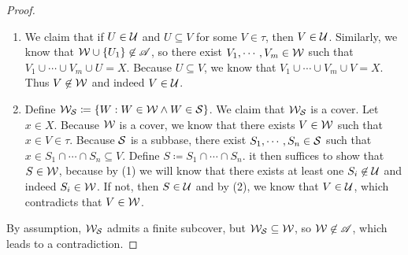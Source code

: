 \documentclass[screen,single]{techreport}
\numberwithin{equation}{section}
\begin{document}
\begin{proof}
\begin{enumerate}
		\item We claim that if $U \in \mathcal{U}$ and $U \subseteq V$ for some $V \in \tau$, then $V \in \mathcal{U}$.
		Similarly, we know that $\mathcal{W} \cup \{ U_1\} \not\in \mathscr{A}$, so there exist $V_1,\cdots,V_m \in \mathcal{W}$ such that $V_1\cup \cdots \cup V_m \cup U = X$.
		Because $U \subseteq V$, we know that $V_1 \cup \cdots \cup V_m \cup V = X$.
		Thus $V \not\in \mathcal{W}$ and indeed $V \in \mathcal{U}$.
		
		\item Define $\mathcal{W}_{\mathcal{S}} \coloneqq \{ W : W \in \mathcal{W} \wedge W \in \mathcal{S} \}$.
		We claim that $\mathcal{W}_{\mathcal{S}}$ is a cover.
		Let $x \in X$.
		Because $\mathcal{W}$ is a cover, we know that there exists $V \in \mathcal{W}$ such that $x \in V \in \tau$.
		Because $\mathcal{S}$ is a subbase, there exist $S_1,\cdots,S_n \in \mathcal{S}$ such that $x \in S_1 \cap \cdots \cap S_n \subseteq V$.
		Define $S \coloneqq S_1 \cap \cdots \cap S_n$.
		it then suffices to show that $S \in \mathcal{W}$, because by (1) we will know that there exists at least one $S_i \not\in \mathcal{U}$ and indeed $S_i \in \mathcal{W}$.
		If not, then $S \in \mathcal{U}$ and by (2), we know that $V \in \mathcal{U}$, which contradicts that $V \in \mathcal{W}$.
	\end{enumerate}
	By assumption, $\mathcal{W}_{\mathcal{S}}$ admits a finite subcover, but $\mathcal{W}_{\mathcal{S}} \subseteq \mathcal{W}$, so $\mathcal{W} \not\in \mathscr{A}$, which leads to a contradiction.
\end{proof}
\end{document}
